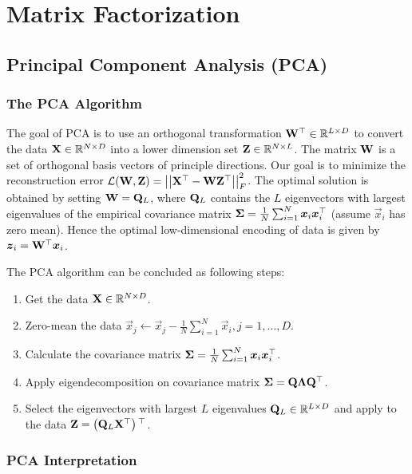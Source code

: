 
\chapter{Matrix Factorization}
\label{chapter4}

\section{Principal Component Analysis (PCA)}

\subsection{The PCA Algorithm}

The goal of PCA is to use an orthogonal transformation $\mathbf{W}{}^\top\in\mathbb{R}^{L\times D}$ to convert the data $\mathbf{X}\in\mathbb{R}^{N\times D}$ into a lower dimension set $\mathbf{Z}\in\mathbb{R}^{N\times L}$. The matrix $\mathbf{W}$ is a set of orthogonal basis vectors of principle directions. Our goal is to minimize the reconstruction error $\mathcal{L}(\mathbf{W},\mathbf{Z})=\left\vert\left\vert \mathbf{X}{}^\top-\mathbf{W}\mathbf{Z}{}^\top \right\vert\right\vert_F^2$. The optimal solution is obtained by setting $\mathbf{W}=\mathbf{Q}_L$, where $\mathbf{Q}_L$ contains the $L$ eigenvectors with largest eigenvalues of the empirical covariance matrix $\mathbf{\Sigma}=\frac{1}{N}\sum_{i=1}^N\boldsymbol{x}_i\boldsymbol{x}_i^\top$ (assume $\vec{x}_i$ has zero mean). Hence the optimal low-dimensional encoding of data is given by $\boldsymbol{z}_i=\mathbf{W}{}^\top\boldsymbol{x}_i$.

The PCA algorithm can be concluded as following steps:
\begin{enumerate}
	\item Get the data $\mathbf{X}\in\mathbb{R}^{N\times D}$.
	\item Zero-mean the data $\vec{x}_j\gets\vec{x}_j-\frac{1}{N}\sum_{i=1}^N\vec{x}_i,j=1,\dotsc,D$.
	\item Calculate the covariance matrix $\mathbf{\Sigma}=\frac{1}{N}\sum_{i=1}^N\boldsymbol{x}_i\boldsymbol{x}_i^\top$.
	\item Apply eigendecomposition on covariance matrix $\mathbf{\Sigma}=\mathbf{Q}\mathbf{\Lambda}\mathbf{Q}{}^\top$.
	\item Select the eigenvectors with largest $L$ eigenvalues $\mathbf{Q}_L\in\mathbb{R}^{L\times D}$ and apply to the data $\mathbf{Z}=\left(\mathbf{Q}_L\mathbf{X}{}^\top\right){}^\top$.
\end{enumerate}

\subsection{PCA Interpretation}

